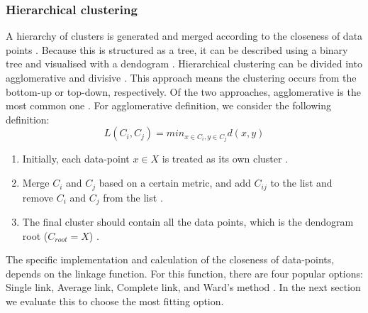 \subsubsection{Hierarchical clustering}
A hierarchy of clusters is generated and merged according to the closeness of data points \citep{meng_private_2021}. Because this is structured as a tree, it can be described using a binary tree and visualised with a dendogram  \citep{nielsen_hierarchical_2016}.
Hierarchical clustering can be divided into agglomerative and divisive \citep{meng_private_2021}.
This approach means the clustering occurs from the bottom-up or top-down, respectively.
Of the two approaches, agglomerative is the most common one \citep{meng_private_2021}.
For  agglomerative definition, we consider the following definition:
\begin{equation}
  L(C_i, C_j) = min_{x \in C_i, y \in C_j} d(x, y)
\end{equation}
\begin{enumerate}
  \item Initially, each data-point $x \in X$ is treated as its own cluster \citep{nielsen_hierarchical_2016}.
  \item Merge $C_i$ and $C_j$ based on a certain metric, and add $C_{ij}$ to the list and remove $C_i$ and $C_j$ from the list \citep{nielsen_hierarchical_2016}.
  \item The final cluster should contain all the data points, which is the dendogram root ($C_{root} = X$) \citep{nielsen_hierarchical_2016}.
\end{enumerate}
The specific implementation and calculation of the closeness of data-points, depends on the linkage function.
For this function, there are four popular options: Single link, Average link, Complete link, and Ward's method \citep{roux_comparative_2015}. In the next section we evaluate this to choose the most fitting option.

